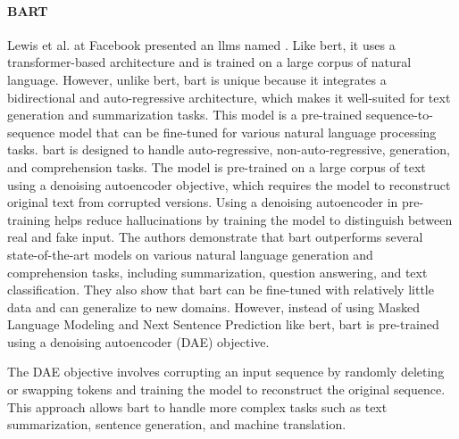     
    
    \paragraph{BART\\}
    Lewis et al. at Facebook presented an \glspl{llm} named  \cite{lewisBARTDenoisingSequencetoSequence2019}. Like \gls{bert}, it uses a transformer-based architecture and is trained on a large corpus of natural language. However, unlike \gls{bert}, \gls{bart} is unique because it integrates a bidirectional and auto-regressive architecture, which makes it well-suited for text generation and summarization tasks. 
    This model is a pre-trained sequence-to-sequence model that can be fine-tuned for various natural language processing tasks. \gls{bart} is designed to handle auto-regressive, non-auto-regressive, generation, and comprehension tasks. The model is pre-trained on a large corpus of text using a denoising autoencoder objective, which requires the model to reconstruct original text from corrupted versions. Using a denoising autoencoder in pre-training helps reduce hallucinations by training the model to distinguish between real and fake input. 
    The authors demonstrate that \gls{bart} outperforms several state-of-the-art models on various natural language generation and comprehension tasks, including summarization, question answering, and text classification. They also show that \gls{bart} can be fine-tuned with relatively little data and can generalize to new domains. 
    However, instead of using Masked Language Modeling and Next Sentence Prediction like \gls{bert}, \gls{bart} is pre-trained using a denoising autoencoder (DAE) objective.

    The DAE objective involves corrupting an input sequence by randomly deleting or swapping tokens and training the model to reconstruct the original sequence. This approach allows \gls{bart} to handle more complex tasks such as text summarization, sentence generation, and machine translation.
        
    
    

